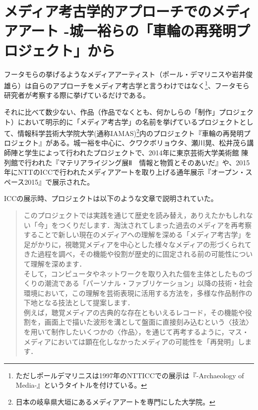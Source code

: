 \documentclass[a4paper,report]{jsbook}
\begin{document}
\section{メディア考古学的アプローチでのメディアアート
-城一裕らの「車輪の再発明プロジェクト」から}\label{ux30e1ux30c7ux30a3ux30a2ux8003ux53e4ux5b66ux7684ux30a2ux30d7ux30edux30fcux30c1ux3067ux306eux30e1ux30c7ux30a3ux30a2ux30a2ux30fcux30c8--ux57ceux4e00ux88d5ux3089ux306eux8ecaux8f2aux306eux518dux767aux660eux30d7ux30edux30b8ux30a7ux30afux30c8ux304bux3089}

フータモらの挙げるようなメディアアーティスト（ポール・デマリニスや岩井俊雄ら）は自らのアプローチをメディア考古学と言うわけではなく\footnote{ただしポールデマリニスは1997年のNTTICCでの展示は『-Archaeology
  of Media-』というタイトルを付けている。}、フータモら研究者が考察する際に挙げているだけである。

それに比べて数少ない、作品（作品でなくとも、何かしらの「制作」プロジェクト）において明示的に「メディア考古学」の名前を挙げているプロジェクトとして、情報科学芸術大学院大学(通称IAMAS)\footnote{日本の岐阜県大垣にあるメディアアートを専門にした大学院。}内のプロジェクト『車輪の再発明プロジェクト』がある。城一裕を中心に、クワクボリョウタ、瀬川晃、松井茂ら講師陣と学生によって行われたプロジェクトで、2014年に東京芸術大学美術館
陳列館で行われた『マテリアライジング展Ⅱ　情報と物質とそのあいだ』や、2015年にNTTのICCで行われたメディアアートを取り上げる通年展示『オープン・スペース2015』で展示された。\autocites{iamas:RIWP}{mtrlzng:RIWP}

ICCの展示時、プロジェクトは以下のような文章で説明されていた。

\begin{quote}
このプロジェクトでは実践を通じて歴史を読み替え，ありえたかもしれない「今」をつくりだします．淘汰されてしまった過去のメディアを再考察することで新しい現在のメディアへの理解を深める「メディア考古学」を足がかりに，視聴覚メディアを中心とした様々なメディアの形づくられてきた過程を調べ，その機能や役割が歴史的に固定される前の可能性について理解を深めます．\\
そして，コンピュータやネットワークを取り入れた個を主体としたものづくりの潮流である「パーソナル・ファブリケーション」以降の技術・社会環境において，この理解を芸術表現に活用する方法を，多様な作品制作の下地となる技法として提案します．\\
例えば，聴覚メディアの古典的な存在ともいえるレコード，その機能や役割を，画面上で描いた波形を溝として盤面に直接刻み込むという〈技法〉を用いて制作したいくつかの〈作品〉，を通じて再考するように，マス・メディアにおいては顕在化しなかったメディアの可能性を「再発明」します．\\
\autocite{iamas:RIWP}
\end{quote}
\end{document}
